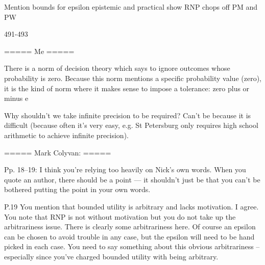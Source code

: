 
Mention bounds for epsilon epistemic and practical
show RNP chops off PM and PW

491-493




=====
Me
=====

There is a norm of decision theory which says to ignore outcomes whose probability is zero. Because this norm mentions a specific probability value (zero), it is the kind of norm where it makes sense to impose a tolerance: zero plus or minus e

Why shouldn't we take infinite precision to be required? Can't be because it is difficult (because often it's very easy, e.g. St Petersburg only requires high school arithmetic to achieve infinite precision).

=====
Mark Colyvan:
=====

Pp. 18--19: I think you're relying too heavily on Nick's own words. When you quote an author, there should be a point --- it shouldn't just be that you can't be bothered putting the point in your own words.

P.19 You mention that bounded utility is arbitrary and lacks motivation. I agree. You note that RNP is not without motivation but you do not take up the arbitrariness issue. There is clearly some arbitrariness here. Of course an epsilon can be chosen to avoid trouble in any case, but the epsilon will need to be hand picked in each case. You need to say something about this obvious arbitrariness -- especially since you've charged bounded utility with being arbitrary.

